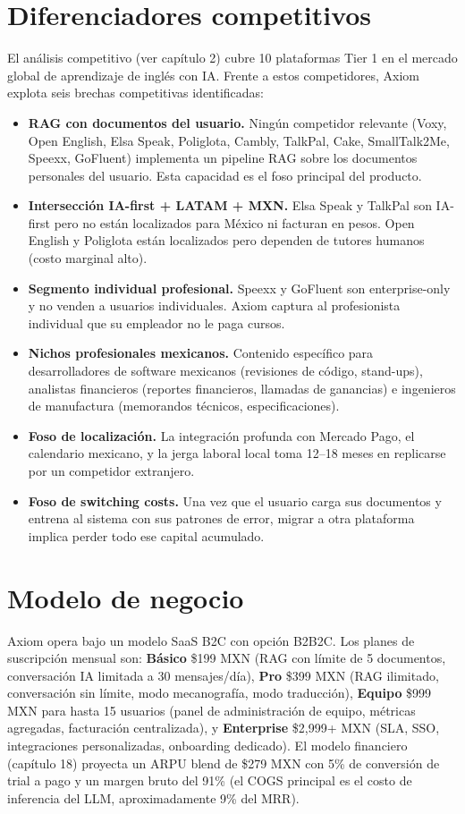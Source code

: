 \documentclass[10pt,a4paper,oneside]{report}
\begin{document}
\section{Diferenciadores competitivos}
El análisis competitivo (ver capítulo 2) cubre 10 plataformas Tier 1 en el mercado global de aprendizaje de inglés con IA. Frente a estos competidores, Axiom explota seis brechas competitivas identificadas:

\begin{itemize}[leftmargin=1.4em]
\item \textbf{RAG con documentos del usuario.} Ningún competidor relevante (Voxy, Open English, Elsa Speak, Poliglota, Cambly, TalkPal, Cake, SmallTalk2Me, Speexx, GoFluent) implementa un pipeline RAG sobre los documentos personales del usuario. Esta capacidad es el foso principal del producto.
\item \textbf{Intersección IA-first + LATAM + MXN.} Elsa Speak y TalkPal son IA-first pero no están localizados para México ni facturan en pesos. Open English y Poliglota están localizados pero dependen de tutores humanos (costo marginal alto).
\item \textbf{Segmento individual profesional.} Speexx y GoFluent son enterprise-only y no venden a usuarios individuales. Axiom captura al profesionista individual que su empleador no le paga cursos.
\item \textbf{Nichos profesionales mexicanos.} Contenido específico para desarrolladores de software mexicanos (revisiones de código, stand-ups), analistas financieros (reportes financieros, llamadas de ganancias) e ingenieros de manufactura (memorandos técnicos, especificaciones).
\item \textbf{Foso de localización.} La integración profunda con Mercado Pago, el calendario mexicano, y la jerga laboral local toma 12–18 meses en replicarse por un competidor extranjero.
\item \textbf{Foso de switching costs.} Una vez que el usuario carga sus documentos y entrena al sistema con sus patrones de error, migrar a otra plataforma implica perder todo ese capital acumulado.
\end{itemize}

\section{Modelo de negocio}
Axiom opera bajo un modelo SaaS B2C con opción B2B2C. Los planes de suscripción mensual son: \textbf{Básico} \$199 MXN (RAG con límite de 5 documentos, conversación IA limitada a 30 mensajes/día), \textbf{Pro} \$399 MXN (RAG ilimitado, conversación sin límite, modo mecanografía, modo traducción), \textbf{Equipo} \$999 MXN para hasta 15 usuarios (panel de administración de equipo, métricas agregadas, facturación centralizada), y \textbf{Enterprise} \$2,999+ MXN (SLA, SSO, integraciones personalizadas, onboarding dedicado). El modelo financiero (capítulo 18) proyecta un ARPU blend de \$279 MXN con 5\% de conversión de trial a pago y un margen bruto del 91\% (el COGS principal es el costo de inferencia del LLM, aproximadamente 9\% del MRR).
\end{document}

